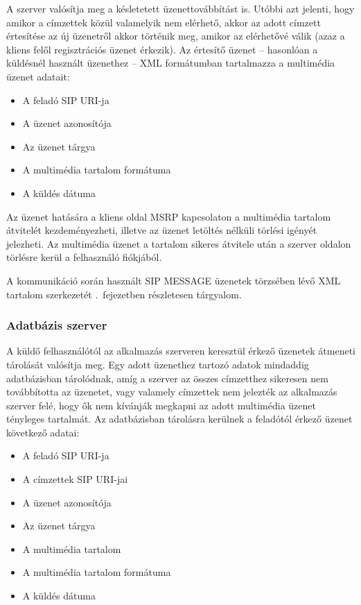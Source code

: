 A szerver valósítja meg a késletetett üzenettovábbítást is. Utóbbi azt jelenti, hogy amikor a címzettek közül valamelyik nem elérhető, akkor az adott címzett értesítése az új üzenetről akkor történik meg, amikor az elérhetővé válik (azaz a kliens felől regisztrációs üzenet érkezik). Az értesítő üzenet -- hasonlóan a küldésnél használt üzenethez -- XML formátumban tartalmazza a multimédia üzenet adatait:

\begin{itemize}\itemsep1pt
\item	A feladó SIP URI-ja
\item A üzenet azonosítója
\item Az üzenet tárgya
\item A multimédia tartalom formátuma
\item A küldés dátuma
\end{itemize}

Az üzenet hatására a kliens oldal MSRP kapcsolaton a multimédia tartalom átvitelét kezdeményezheti, illetve az üzenet letöltés nélküli törlési igényét jelezheti. Az multimédia üzenet a tartalom sikeres átvitele után a szerver oldalon törlésre kerül a felhasználó fiókjából.

A kommunikáció során használt SIP MESSAGE üzenetek törzsében lévő XML tartalom szerkezetét .~fejezetben részletesen tárgyalom.

\subsubsection{Adatbázis szerver}
\label{sec:dbserver}

A küldő felhasználótól az alkalmazás szerveren keresztül érkező üzenetek átmeneti tárolását valósítja meg. Egy adott üzenethez tartozó adatok mindaddig adatbázisban tárolódnak, amíg a szerver az összes címzetthez sikeresen nem továbbította az üzenetet, vagy valamely címzettek nem jelezték az alkalmazás szerver felé, hogy ők nem kívánják megkapni az adott multimédia üzenet tényleges tartalmát. Az adatbázisban tárolásra kerülnek a feladótól érkező üzenet következő adatai:

\begin{itemize}\itemsep1pt
\item	A feladó SIP URI-ja
\item A címzettek SIP URI-jai
\item A üzenet azonosítója
\item Az üzenet tárgya
\item A multimédia tartalom
\item A multimédia tartalom formátuma
\item A küldés dátuma
\end{itemize}

